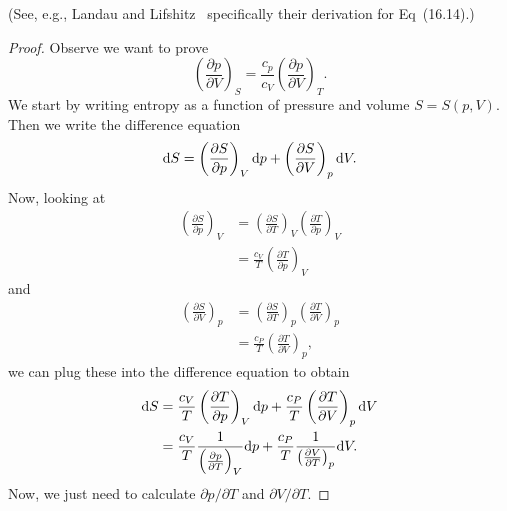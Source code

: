 (See, e.g., Landau and Lifshitz~\cite[\S16]{landau1969statmech}
specifically their derivation for Eq~(16.14).)

\begin{proof}
Observe we want to prove
\begin{equation}
\left(\frac{\partial p}{\partial V}\right)_{S} = \frac{c_{p}}{c_{V}}\left(\frac{\partial p}{\partial V}\right)_{T}.
\end{equation}
We start by writing entropy as a function of pressure and volume $S=S(p,V)$.
Then we write the difference equation
\begin{equation}
\mathrm{d} S = \left(\frac{\partial S}{\partial p}\right)_{V}\mathrm{d} p
+ \left(\frac{\partial S}{\partial V}\right)_{p}\mathrm{d} V.
\end{equation}
Now, looking at
\begin{subequations}
  \begin{align}
\left(\frac{\partial S}{\partial p}\right)_{V} &= \left(\frac{\partial S}{\partial T}\right)_{V}\left(\frac{\partial T}{\partial p}\right)_{V}\\
&=\frac{c_{V}}{T}\left(\frac{\partial T}{\partial p}\right)_{V}
  \end{align}
\end{subequations}
and
\begin{subequations}
  \begin{align}
\left(\frac{\partial S}{\partial V}\right)_{p}
&= \left(\frac{\partial S}{\partial T}\right)_{p}\left(\frac{\partial T}{\partial V}\right)_{p}\\
&= \frac{c_{P}}{T}\left(\frac{\partial T}{\partial V}\right)_{p},
  \end{align}
\end{subequations}
we can plug these into the difference equation to obtain
\begin{subequations}\label{eq:fall:lec16:difference-spec-heat:step3}
  \begin{align}
\mathrm{d} S &=
\frac{c_{V}}{T}\left(\frac{\partial T}{\partial p}\right)_{V}\mathrm{d} p
+ \frac{c_{P}}{T}\left(\frac{\partial T}{\partial V}\right)_{p}\mathrm{d} V\\
&=\frac{c_{V}}{T}\frac{1}{\left(\frac{\partial p}{\partial T}\right)_{V}}\mathrm{d} p
+ \frac{c_{P}}{T}\frac{1}{\left(\frac{\partial V}{\partial T}\right)_{p}}\mathrm{d} V.
  \end{align}
\end{subequations}
Now, we just need to calculate $\partial p/\partial T$ and $\partial V/\partial T$.


\end{proof}
